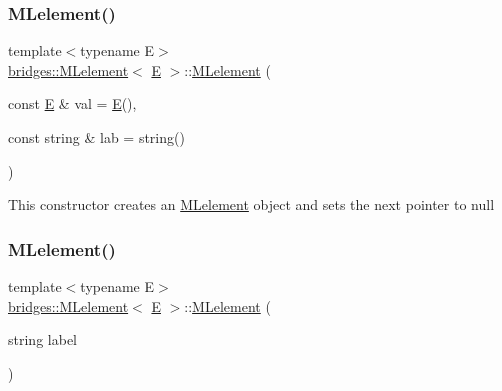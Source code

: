 \subsubsection{\texorpdfstring{MLelement()}{MLelement()}\hspace{0.1cm}{\footnotesize\ttfamily [1/3]}}
{\footnotesize\ttfamily template$<$typename E$>$ \\
\mbox{\hyperlink{classbridges_1_1_m_lelement}{bridges\+::\+M\+Lelement}}$<$ \mbox{\hyperlink{namespacebridges_acfb0a4f7877d8f63de3e6862004c50eda3a3ea00cfc35332cedf6e5e9a32e94da}{E}} $>$\+::\mbox{\hyperlink{classbridges_1_1_m_lelement}{M\+Lelement}} (\begin{DoxyParamCaption}\item[{const \mbox{\hyperlink{namespacebridges_acfb0a4f7877d8f63de3e6862004c50eda3a3ea00cfc35332cedf6e5e9a32e94da}{E}} \&}]{val = {\ttfamily \mbox{\hyperlink{namespacebridges_acfb0a4f7877d8f63de3e6862004c50eda3a3ea00cfc35332cedf6e5e9a32e94da}{E}}()},  }\item[{const string \&}]{lab = {\ttfamily string()} }\end{DoxyParamCaption})\hspace{0.3cm}{\ttfamily [inline]}}

This constructor creates an \mbox{\hyperlink{classbridges_1_1_m_lelement}{M\+Lelement}} object and sets the next pointer to null \mbox{\label{classbridges_1_1_m_lelement_ade42b08d96030f1ed5b92c5613d5cedd}} 
\subsubsection{\texorpdfstring{MLelement()}{MLelement()}\hspace{0.1cm}{\footnotesize\ttfamily [2/3]}}
{\footnotesize\ttfamily template$<$typename E$>$ \\
\mbox{\hyperlink{classbridges_1_1_m_lelement}{bridges\+::\+M\+Lelement}}$<$ \mbox{\hyperlink{namespacebridges_acfb0a4f7877d8f63de3e6862004c50eda3a3ea00cfc35332cedf6e5e9a32e94da}{E}} $>$\+::\mbox{\hyperlink{classbridges_1_1_m_lelement}{M\+Lelement}} (\begin{DoxyParamCaption}\item[{string}]{label }\end{DoxyParamCaption})\hspace{0.3cm}{\ttfamily [inline]}}

